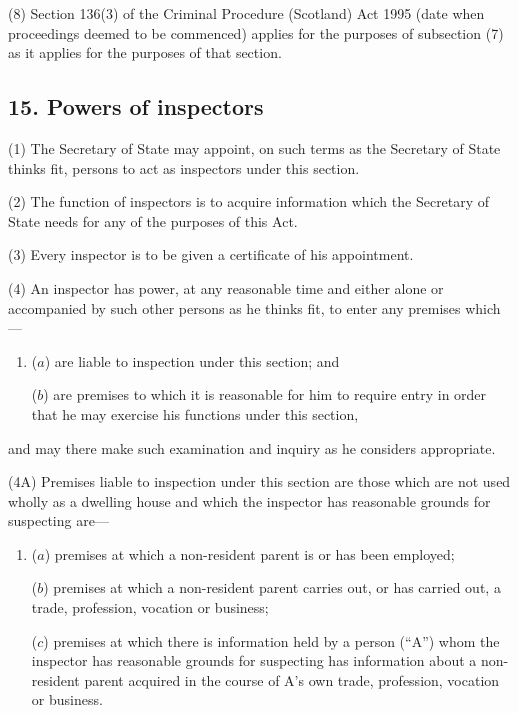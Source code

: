 \documentclass[a4paper]{article}
\begin{document}
(8)
Section 136(3) of the Criminal Procedure (Scotland) Act 1995 (date
when proceedings deemed to be commenced) applies for the purposes of subsection
(7) as it applies for the purposes of that section.


\subsection{15. Powers of inspectors}

(1) The Secretary of State may appoint, on such terms as the Secretary of State thinks fit, persons to act as inspectors under this section.

(2)
The function of inspectors is to acquire information which the Secretary of State needs for any of the purposes of this Act.

(3)
Every inspector is to be given a certificate of his appointment.

(4)
An inspector has power, at any reasonable time and either alone or accompanied by such other persons as he thinks fit, to enter any premises which---
\begin{enumerate}\item[]
($a$) are liable to inspection under this section; and

($b$) are premises to which it is reasonable for him to require entry in order that he may exercise his functions under this section,
\end{enumerate}
and may there make such examination and inquiry as he considers appropriate.

(4A) Premises liable to inspection under this section are those which are not used wholly as a dwelling house and which the inspector has reasonable grounds for suspecting are---
\begin{enumerate}\item[]
($a$) premises at which a non-resident parent is or has been employed;

($b$) premises at which a non-resident parent carries out, or has carried out, a trade, profession, vocation or business;

($c$) premises at which there is information held by a person (“A”) whom the inspector has reasonable grounds for suspecting has information about a non-resident parent acquired in the course of A’s own trade, profession, vocation or business.
\end{enumerate}
\end{document}
